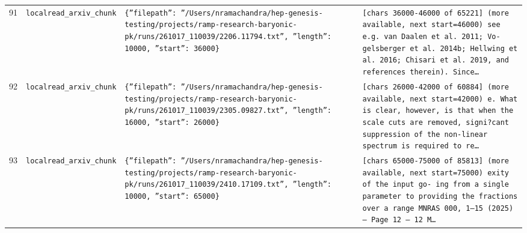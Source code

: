 \documentclass[11pt,a4paper]{article}
\begin{document}
\begin{longtable}{@{}p{}p{}p{}p{}@{}}
91 & \texttt{local}\newline\texttt{read\_\allowbreak{}arxiv\_\allowbreak{}chunk} & \texttt{\{''filepath'':\allowbreak{} ''/\allowbreak{}Users/\allowbreak{}nramachandra/\allowbreak{}hep-genesis-testing/\allowbreak{}projects/\allowbreak{}ramp-research-baryonic-pk/\allowbreak{}runs/\allowbreak{}261017\_\allowbreak{}110039/\allowbreak{}2206.11794.txt'',\allowbreak{} ''length'':\allowbreak{} 10000,\allowbreak{} ''start'':\allowbreak{} 36000\}\allowbreak{}} & \texttt{[chars 36000-46000 of 65221]\allowbreak{} (more available,\allowbreak{} next start=\allowbreak{}46000)\allowbreak{}  see e.g. van Daalen et al. 2011;\allowbreak{} Vo- gelsberger et al. 2014b;\allowbreak{} Hellwing et al. 2016;\allowbreak{} Chisari et al. 2019,\allowbreak{} and references therein)\allowbreak{}. Since\ldots{}\allowbreak{}} \\
92 & \texttt{local}\newline\texttt{read\_\allowbreak{}arxiv\_\allowbreak{}chunk} & \texttt{\{''filepath'':\allowbreak{} ''/\allowbreak{}Users/\allowbreak{}nramachandra/\allowbreak{}hep-genesis-testing/\allowbreak{}projects/\allowbreak{}ramp-research-baryonic-pk/\allowbreak{}runs/\allowbreak{}261017\_\allowbreak{}110039/\allowbreak{}2305.09827.txt'',\allowbreak{} ''length'':\allowbreak{} 16000,\allowbreak{} ''start'':\allowbreak{} 26000\}\allowbreak{}} & \texttt{[chars 26000-42000 of 60884]\allowbreak{} (more available,\allowbreak{} next start=\allowbreak{}42000)\allowbreak{}  e. What is clear,\allowbreak{} however,\allowbreak{} is that when the scale cuts are removed,\allowbreak{} signi?cant suppression of the non-linear spectrum is required to re\ldots{}\allowbreak{}} \\
93 & \texttt{local}\newline\texttt{read\_\allowbreak{}arxiv\_\allowbreak{}chunk} & \texttt{\{''filepath'':\allowbreak{} ''/\allowbreak{}Users/\allowbreak{}nramachandra/\allowbreak{}hep-genesis-testing/\allowbreak{}projects/\allowbreak{}ramp-research-baryonic-pk/\allowbreak{}runs/\allowbreak{}261017\_\allowbreak{}110039/\allowbreak{}2410.17109.txt'',\allowbreak{} ''length'':\allowbreak{} 10000,\allowbreak{} ''start'':\allowbreak{} 65000\}\allowbreak{}} & \texttt{[chars 65000-75000 of 85813]\allowbreak{} (more available,\allowbreak{} next start=\allowbreak{}75000)\allowbreak{}  exity of the input go- ing from a single parameter to providing the fractions over a range MNRAS 000,\allowbreak{} 1--15 (2025)\allowbreak{}  --- Page 12 --- 12 M\ldots{}\allowbreak{}} \\

\end{longtable}
\end{document}
